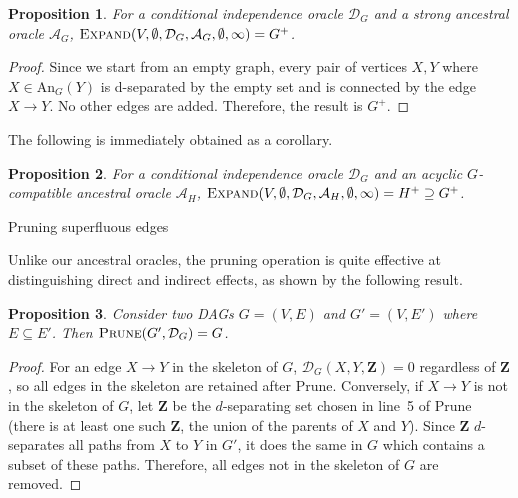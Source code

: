 \documentclass[accepted]{uai2025} %
\newtheorem{proposition}{Proposition}
\begin{document}
\begin{proposition}
For a conditional independence oracle
 $\mathcal{D}_G$ and a strong ancestral oracle $\mathcal{A}_G$, 
$\textsc{Expand}(V,\emptyset,\mathcal{D}_G,\mathcal{A}_G, \emptyset, \infty)=G^+$.
\label{prop:strongexpand}
\end{proposition}

\begin{proof}
Since we start from an empty graph, every pair of vertices $X, Y$ where
 $X \in \textrm{An}_G(Y)$ is d-separated by the empty set and is
 connected by the edge $X \to Y$. No other edges are added. Therefore, 
the result is $G^+$. 
\end{proof}

The following is immediately obtained as a corollary. 

\begin{proposition}
For a conditional independence oracle
 $\mathcal{D}_G$ and an acyclic $G$-compatible ancestral oracle $\mathcal{A}_H$, 
$\textsc{Expand}(V,\emptyset,\mathcal{D}_G,\mathcal{A}_H, \emptyset, \infty)
=H^+ \supseteq G^+$.
\label{prop:weakexpand}
\end{proposition}


\begin{algorithm}[h]
\DontPrintSemicolon
\SetAlgoLined

\caption{Pruning superfluous edges}
\label{algo:prune}
\end{algorithm}

Unlike our ancestral oracles, the pruning operation is 
quite effective at distinguishing
direct and indirect effects, as shown by the following result.

\begin{proposition}
Consider two DAGs $G=(V,E)$ and $G'=(V,E')$ where $E \subseteq E'$. 
Then $\textsc{Prune}(G',\mathcal{D}_G)=G$.
\label{prop:prune}
\end{proposition}

\begin{proof}
For an edge $X \to Y$ in the skeleton of $G$, 
$\mathcal{D}_G(X, Y, \mathbf{Z}) = 0$ regardless 
of $\mathbf{Z}$, so all edges in the skeleton are 
retained after {\sc Prune}. Conversely, if 
 $X \to Y$ is not in the skeleton of $G$, let 
$\mathbf{Z}$ be the $d$-separating set chosen 
in line~5 of {\sc Prune} (there is at least one 
such $\mathbf{Z}$, the union of the parents of 
$X$ and $Y$). Since  $\mathbf{Z}$ $d$-separates 
all paths from $X$ to $Y$ in $G'$, it does the same 
in $G$ which contains a subset of these paths. 
Therefore, all edges not in the skeleton of $G$ are 
removed.
\end{proof}
\end{document}
